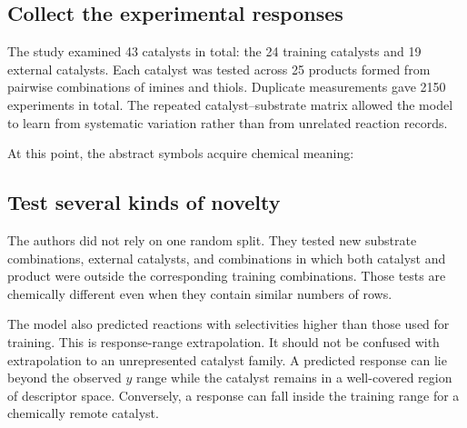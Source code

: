 \subsection{Collect the experimental responses}

The study examined 43 catalysts in total: the 24 training catalysts and 19 external catalysts.
Each catalyst was tested across 25 products formed from pairwise combinations of imines and thiols.
Duplicate measurements gave 2150 experiments in total.
The repeated catalyst--substrate matrix allowed the model to learn from systematic variation rather than from unrelated reaction records.

At this point, the abstract symbols acquire chemical meaning:


\subsection{Test several kinds of novelty}

The authors did not rely on one random split.
They tested new substrate combinations, external catalysts, and combinations in which both catalyst and product were outside the corresponding training combinations.
Those tests are chemically different even when they contain similar numbers of rows.

The model also predicted reactions with selectivities higher than those used for training.
This is response-range extrapolation.
It should not be confused with extrapolation to an unrepresented catalyst family.
A predicted response can lie beyond the observed $y$ range while the catalyst remains in a well-covered region of descriptor space.
Conversely, a response can fall inside the training range for a chemically remote catalyst.


